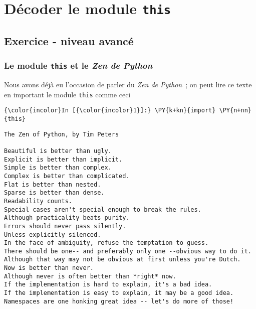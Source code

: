     
    
    
    

    

    \hypertarget{duxe9coder-le-module-this}{%
\section{\texorpdfstring{Décoder le module
\texttt{this}}{Décoder le module this}}\label{duxe9coder-le-module-this}}

    \hypertarget{exercice---niveau-avancuxe9}{%
\subsection{Exercice - niveau
avancé}\label{exercice---niveau-avancuxe9}}

    \hypertarget{le-module-this-et-le-zen-de-python}{%
\subsubsection{\texorpdfstring{Le module \texttt{this} et le \emph{Zen
de
Python}}{Le module this et le Zen de Python}}\label{le-module-this-et-le-zen-de-python}}

    Nous avons déjà eu l'occasion de parler du \emph{Zen de Python}~; on
peut lire ce texte en important le module \texttt{this} comme ceci

    \begin{Verbatim}[commandchars=\\\{\},frame=single,framerule=0.3mm,rulecolor=\color{cellframecolor}]
{\color{incolor}In [{\color{incolor}1}]:} \PY{k+kn}{import} \PY{n+nn}{this}
\end{Verbatim}


    \begin{Verbatim}[commandchars=\\\{\},frame=single,framerule=0.3mm,rulecolor=\color{cellframecolor}]
The Zen of Python, by Tim Peters

Beautiful is better than ugly.
Explicit is better than implicit.
Simple is better than complex.
Complex is better than complicated.
Flat is better than nested.
Sparse is better than dense.
Readability counts.
Special cases aren't special enough to break the rules.
Although practicality beats purity.
Errors should never pass silently.
Unless explicitly silenced.
In the face of ambiguity, refuse the temptation to guess.
There should be one-- and preferably only one --obvious way to do it.
Although that way may not be obvious at first unless you're Dutch.
Now is better than never.
Although never is often better than *right* now.
If the implementation is hard to explain, it's a bad idea.
If the implementation is easy to explain, it may be a good idea.
Namespaces are one honking great idea -- let's do more of those!
\end{Verbatim}

